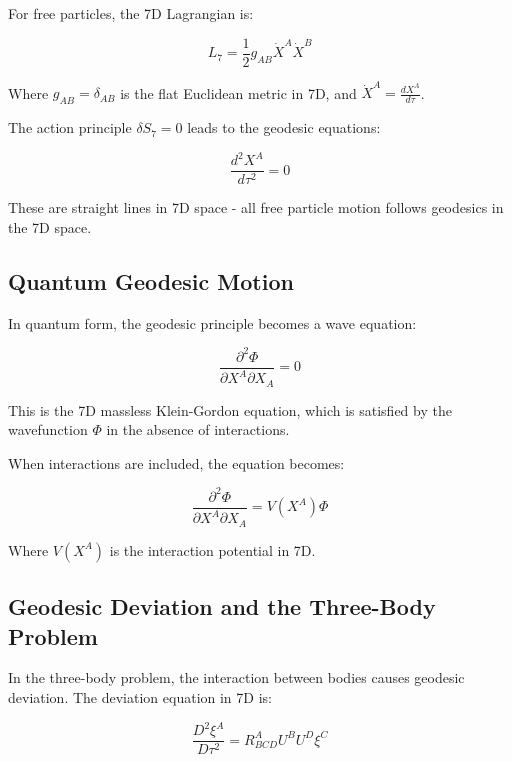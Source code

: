 \documentclass{article}
\begin{document}
For free particles, the 7D Lagrangian is:

\begin{equation}
L_7 = \frac{1}{2}g_{AB}\dot{X}^A\dot{X}^B
\end{equation}

Where $g_{AB} = \delta_{AB}$ is the flat Euclidean metric in 7D, and $\dot{X}^A = \frac{dX^A}{d\tau}$.

The action principle $\delta S_7 = 0$ leads to the geodesic equations:

\begin{equation}
\frac{d^2 X^A}{d\tau^2} = 0
\end{equation}

These are straight lines in 7D space - all free particle motion follows geodesics in the 7D space.

\subsection{Quantum Geodesic Motion}

In quantum form, the geodesic principle becomes a wave equation:

\begin{equation}
\frac{\partial^2 \Phi}{\partial X^A \partial X_A} = 0
\end{equation}

This is the 7D massless Klein-Gordon equation, which is satisfied by the wavefunction $\Phi$ in the absence of interactions.

When interactions are included, the equation becomes:

\begin{equation}
\frac{\partial^2 \Phi}{\partial X^A \partial X_A} = V(X^A) \Phi
\end{equation}

Where $V(X^A)$ is the interaction potential in 7D.

\subsection{Geodesic Deviation and the Three-Body Problem}

In the three-body problem, the interaction between bodies causes geodesic deviation. The deviation equation in 7D is:

\begin{equation}
\frac{D^2 \xi^A}{D\tau^2} = R^A_{BCD} U^B U^D \xi^C
\end{equation}
\end{document}
